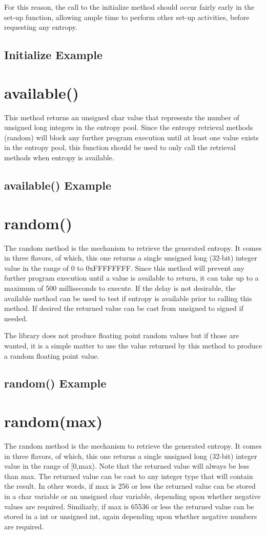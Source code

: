 \documentclass[10pt]{report}
\newcommand{\code}[2]{
 \hrulefill
 \subsection*{#1}
 
 \vspace{2em}
}
\begin{document}
For this reason, the call to the initialize method should occur fairly early in the set-up function, allowing ample time to perform other set-up activities, before
requesting any entropy.

\code{Initialize Example}{initialize_example.ino}

\section{available()}

This method returns an unsigned char value that represents the number of unsigned long integers in the entropy pool.  Since the entropy retrieval methods (random) 
will block any further program execution until at least one value exists in the entropy pool, this function should be used to only call the retrieval methods when entropy is 
available.

\code{available() Example}{available_example.ino}

\section{random()}

The random method is the mechanism to retrieve the generated entropy.  It comes in three flavors, of which, this one returns a single unsigned long (32-bit) integer value in the range
of 0 to 0xFFFFFFFF.  Since this method will prevent any further program execution until a value is available to return, it can take up to a maximum of 500 milliseconds to execute.  If
the delay is not desirable, the available method can be used to test if entropy is available prior to calling this method.  If desired the returned value can be cast from unsigned to
signed if needed. 

The library does not produce floating point random values but if those are wanted, it is a simple matter to use the value returned by this method to produce a random floating point value.

\code{random() Example}{available_example.ino}

\section{random(max)}

The random method is the mechanism to retrieve the generated entropy.  It comes in three flavors, of which, this one returns a single unsigned long (32-bit) integer value in the range
of [0,max).  Note that the returned value will always be less than max.  The returned value can be cast to any integer type that will contain the result.  In other words, if max is 256
or less the returned value can be stored in a char variable or an unsigned char variable, depending upon whether negative values are required. Similiarly, if max is 65536 or less the 
returned value can be stored in a int or unsigned int, again depending upon whether negative numbers are required.  
\end{document}
